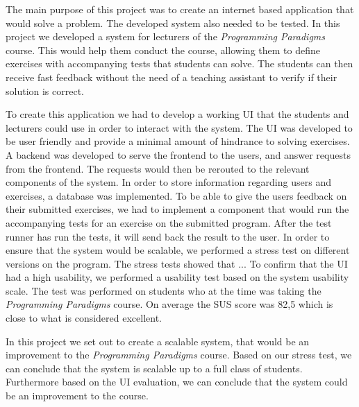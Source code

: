 The main purpose of this project was to create an internet based application that would solve a problem. The developed system also needed to be tested. 
In this project we developed a system for lecturers of the \textit{Programming Paradigms} course. 
This would help them conduct the course, allowing them to define exercises with accompanying tests that students can solve. 
The students can then receive fast feedback without the need of a teaching assistant to verify if their solution is correct. 

To create this application we had to develop a working UI that the students and lecturers could use in order to interact with the system. The UI was developed to be user friendly and provide a minimal amount of hindrance to solving exercises.
A backend was developed to serve the frontend to the users, and answer requests from the frontend. 
The requests would then be rerouted to the relevant components of the system. 
In order to store information regarding users and exercises, a database was implemented.
To be able to give the users feedback on their submitted exercises, we had to implement a component that would run the accompanying tests for an exercise on the submitted program. 
After the test runner has run the tests, it will send back the result to the user.
In order to ensure that the system would be scalable, we performed a stress test on different versions on the program. 
The stress tests showed that ... 
To confirm that the UI had a high usability, we performed a usability test based on the system usability scale.
The test was performed on students who at the time was taking the \textit{Programming Paradigms} course.
On average the SUS score was 82,5 which is close to what is considered excellent.  

In this project we set out to create a scalable system, that would be an improvement to the \textit{Programming Paradigms} course. Based on our stress test, we can conclude that the system is scalable up to a full class of students. 
Furthermore based on the UI evaluation, we can conclude that the system could be an improvement to the course. 